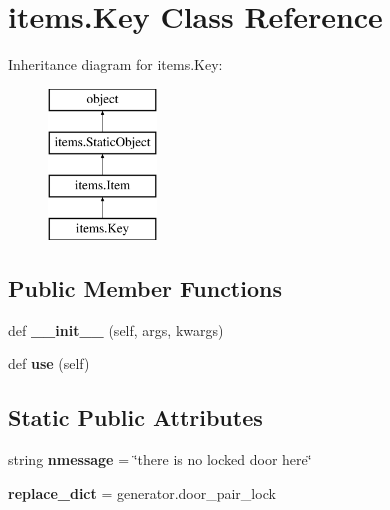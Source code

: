 \hypertarget{classitems_1_1_key}{}\section{items.\+Key Class Reference}
\label{classitems_1_1_key}
Inheritance diagram for items.\+Key\+:\begin{figure}[H]
\begin{center}
\leavevmode
\includegraphics[height=4.000000cm]{classitems_1_1_key}
\end{center}
\end{figure}
\subsection*{Public Member Functions}
\begin{DoxyCompactItemize}
\item 
\hypertarget{classitems_1_1_key_abb0a38e89a6bd24b32b7d4e9d5e02876}{}def {\bfseries \+\_\+\+\_\+init\+\_\+\+\_\+} (self, args, kwargs)\label{classitems_1_1_key_abb0a38e89a6bd24b32b7d4e9d5e02876}

\item 
\hypertarget{classitems_1_1_key_a09852d87d060dc16d00630f84866485f}{}def {\bfseries use} (self)\label{classitems_1_1_key_a09852d87d060dc16d00630f84866485f}

\end{DoxyCompactItemize}
\subsection*{Static Public Attributes}
\begin{DoxyCompactItemize}
\item 
\hypertarget{classitems_1_1_key_af0f3e348e356afbf9577623958dbf908}{}string {\bfseries nmessage} = \char`\"{}there is no locked door here\char`\"{}\label{classitems_1_1_key_af0f3e348e356afbf9577623958dbf908}

\item 
\hypertarget{classitems_1_1_key_a8ed072792b7deb6b1a667ae3dc5c07f1}{}{\bfseries replace\+\_\+dict} = generator.\+door\+\_\+pair\+\_\+lock\label{classitems_1_1_key_a8ed072792b7deb6b1a667ae3dc5c07f1}

\end{DoxyCompactItemize}
